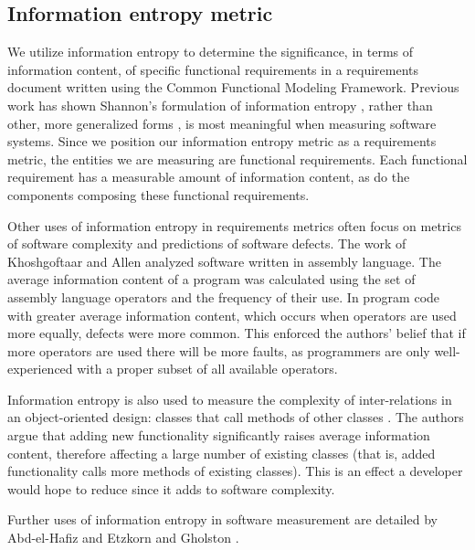 \documentclass{article}
\begin{document}
\subsection{Information entropy metric}

We utilize information entropy to determine the significance, in terms
of information content, of specific functional requirements in a
requirements document written using the Common Functional Modeling
Framework. Previous work \cite{abd-el-hafiz} has shown Shannon's
formulation of information entropy \cite{shannon}, rather than other,
more generalized forms \cite{aczel_daroczy}, is most meaningful when
measuring software systems. Since we position our information entropy
metric as a requirements metric, the entities we are measuring are
functional requirements. Each functional requirement has a measurable
amount of information content, as do the components composing these
functional requirements.

Other uses of information entropy in requirements metrics often focus
on metrics of software complexity and predictions of software
defects. The work of Khoshgoftaar and Allen \cite{khosh_allen}
analyzed software written in assembly language. The average
information content of a program was calculated using the set of
assembly language operators and the frequency of their use. In program
code with greater average information content, which occurs when
operators are used more equally, defects were more common. This
enforced the authors' belief that if more operators are used there
will be more faults, as programmers are only well-experienced with a
proper subset of all available operators.

Information entropy is also used to measure the complexity of
inter-relations in an object-oriented design: classes that call
methods of other classes \cite{chat_steph}. The authors argue that
adding new functionality significantly raises average information
content, therefore affecting a large number of existing classes (that
is, added functionality calls more methods of existing classes). This
is an effect a developer would hope to reduce since it adds to
software complexity.

Further uses of information entropy in software measurement are
detailed by Abd-el-Hafiz \cite{abd-el-hafiz} and Etzkorn and Gholston
\cite{etzkorn_gholston}.
\end{document}
